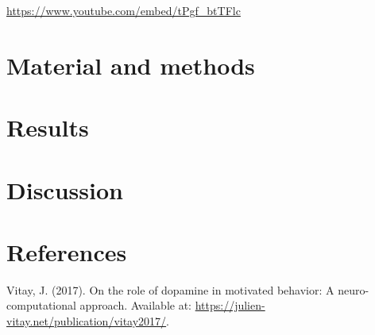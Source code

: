 \documentclass[
  a4paper,
]{article}
\newlength{\cslhangindent}
\newlength{\cslentryspacingunit} %
\newenvironment{CSLReferences}[2] %
 {%
  \setlength{\parindent}{0pt}
  \ifodd #1
  \let\oldpar\par
  \def\par{\hangindent=\cslhangindent\oldpar}
  \fi
  \setlength{\parskip}{#2\cslentryspacingunit}
 }%
 {}
\begin{document}
\url{https://www.youtube.com/embed/tPgf_btTFlc}

\hypertarget{material-and-methods}{%
\section{Material and methods}\label{material-and-methods}}

\hypertarget{sec-results}{%
\section{Results}\label{sec-results}}

\hypertarget{discussion}{%
\section{Discussion}\label{discussion}}

\hypertarget{references}{%
\section*{References}\label{references}}

\hypertarget{refs}{}
\begin{CSLReferences}{1}{0}
\leavevmode{}%
Vitay, J. (2017). On the role of dopamine in motivated behavior: A
neuro-computational approach. Available at:
\url{https://julien-vitay.net/publication/vitay2017/}.

\end{CSLReferences}
\end{document}
